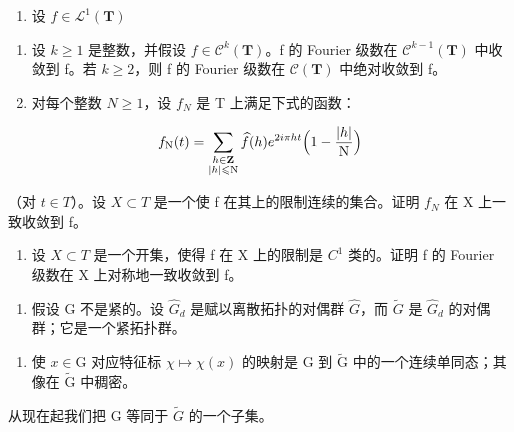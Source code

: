 \begin{enumerate}
\def\labelenumi{\arabic{enumi})}
\setcounter{enumi}{52}
\tightlist
\item
  设 \(f\in \mathcal{L}^1 (\mathbf{T})\)
\end{enumerate}

\begin{enumerate}
\def\labelenumi{\alph{enumi})}
\item
  设 \(k \geqslant 1\) 是整数，并假设 \(f \in \mathcal{C}^{k}(\mathbf{T})\)。f 的 Fourier 级数在 \(\mathcal{C}^{k-1}(\mathbf{T})\) 中收敛到 f。若 \(k \geqslant 2\)，则 f 的 Fourier 级数在 \(\mathcal{C}(\mathbf{T})\) 中绝对收敛到 f。
\item
  对每个整数 \(N \geqslant 1\)，设 \(f_{N}\) 是 T 上满足下式的函数：
\end{enumerate}

\[
f_{\mathrm{N}}(t) = \sum_{\substack{h\in \mathbf{Z}\\ |h|\leqslant \mathrm{N}}}\widehat{f} (h)e^{2i\pi ht}\Bigl (1 - \frac{|h|}{\mathrm{N}}\Bigr)
\]

（对 \(t \in T\)）。设 \(X \subset T\) 是一个使 f 在其上的限制连续的集合。证明 \(f_{N}\) 在 X 上一致收敛到 f。

\begin{enumerate}
\def\labelenumi{\alph{enumi})}
\setcounter{enumi}{2}
\tightlist
\item
  设 \(X \subset T\) 是一个开集，使得 f 在 X 上的限制是 \(C^{1}\) 类的。证明 f 的 Fourier 级数在 X 上对称地一致收敛到 f。
\end{enumerate}

\begin{enumerate}
\def\labelenumi{\arabic{enumi})}
\setcounter{enumi}{53}
\tightlist
\item
  假设 G 不是紧的。设 \(\widehat{G}_{d}\) 是赋以离散拓扑的对偶群 \(\widehat{G}\)，而 \(\widetilde{G}\) 是 \(\widehat{G}_{d}\) 的对偶群；它是一个紧拓扑群。
\end{enumerate}

\begin{enumerate}
\def\labelenumi{\alph{enumi})}
\tightlist
\item
  使 \(x \in \mathrm{G}\) 对应特征标 \(\chi \mapsto \chi(x)\) 的映射是 \(\mathrm{G}\) 到 \(\widetilde{\mathrm{G}}\) 中的一个连续单同态；其像在 \(\widetilde{\mathrm{G}}\) 中稠密。
\end{enumerate}

从现在起我们把 G 等同于 \(\widetilde{G}\) 的一个子集。


